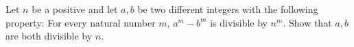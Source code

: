 Let $n$ be a positive and let $a,b$ be two different integers with the following property:
For every natural number $m$, $a^m-b^m$ is divisible by $n^m$.
Show that $a,b$ are both divisible by $n$.